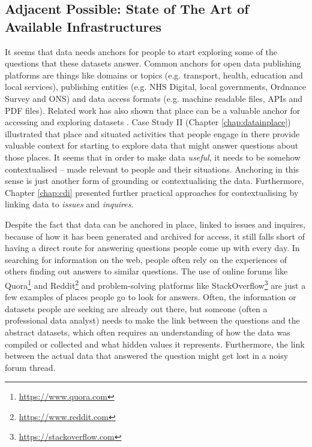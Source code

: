 \subsection[Adjacent Possible]{Adjacent Possible: State of The Art of Available Infrastructures}
It seems that data needs anchors for people to start exploring some of the questions that these datasets answer. Common anchors for open data publishing platforms are things like domains or topics (e.g. transport, health, education and local services), publishing entities (e.g. NHS Digital, local governments, Ordnance Survey and ONS) and data access formats (e.g. machine readable files, APIs and PDF files). Related work has also shown that place can be a valuable anchor for accessing and exploring datasets \citep{taylor_data--place:_2015,puussaar_making_2018}. Case Study II (Chapter \ref{chap:datainplace}) illustrated that place and situated activities that people engage in there provide valuable context for starting to explore data that might answer questions about those places. It seems that in order to make data \textit{useful}, it needs to be somehow contextualised -- made relevant to people and their situations. Anchoring in this sense is just another form of grounding or contextualising the data. Furthermore, Chapter \ref{chap:cdi} presented further practical approaches for contextualising by linking data to \textit{issues} and \textit{inquires}.

Despite the fact that data can be anchored in place, linked to issues and inquires, because of how it has been generated and archived for access, it still falls short of having a direct route for answering questions people come up with every day. In searching for information on the web, people often rely on the experiences of others finding out answers to similar questions. The use of online forums like Quora\footnote{\url{https://www.quora.com}} and Reddit\footnote{\url{https://www.reddit.com}} and problem-solving platforms like StackOverflow\footnote{\url{https://stackoverflow.com}} are just a few examples of places people go to look for answers. Often, the information or datasets people are seeking are already out there, but someone (often a professional data analyst) needs to make the link between the questions and the abstract datasets, which often requires an understanding of how the data was compiled or collected and what hidden values it represents. Furthermore, the link between the actual data that answered the question might get lost in a noisy forum thread.

